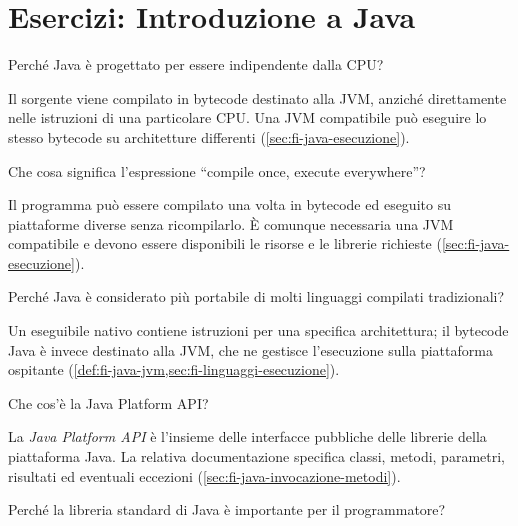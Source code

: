 \chapter{Esercizi: Introduzione a Java}
\label{chap:esercizi-introduzione-java}

\begin{exercise}
\label{ex:fi-esercizi-introduzione-java-portabilita-cpu}
Perché Java è progettato per essere indipendente dalla CPU?
\end{exercise}

Il sorgente viene compilato in bytecode destinato alla JVM, anziché direttamente
nelle istruzioni di una particolare CPU. Una JVM compatibile può eseguire lo
stesso bytecode su architetture differenti (\cref{sec:fi-java-esecuzione}).

\begin{exercise}
\label{ex:fi-esercizi-introduzione-java-compile-once}
Che cosa significa l'espressione ``compile once, execute everywhere''?
\end{exercise}

Il programma può essere compilato una volta in bytecode ed eseguito su
piattaforme diverse senza ricompilarlo. È comunque necessaria una JVM compatibile
e devono essere disponibili le risorse e le librerie richieste
(\cref{sec:fi-java-esecuzione}).

\begin{exercise}
\label{ex:fi-esercizi-introduzione-java-portabilita-confronto}
Perché Java è considerato più portabile di molti linguaggi compilati tradizionali?
\end{exercise}

Un eseguibile nativo contiene istruzioni per una specifica architettura; il
bytecode Java è invece destinato alla JVM, che ne gestisce l'esecuzione sulla
piattaforma ospitante (\cref{def:fi-java-jvm,sec:fi-linguaggi-esecuzione}).

\begin{exercise}
\label{ex:fi-esercizi-introduzione-java-platform-api}
Che cos'è la Java Platform API?
\end{exercise}

La \emph{Java Platform API} è l'insieme delle interfacce pubbliche
delle librerie della piattaforma Java. La relativa documentazione
specifica classi, metodi, parametri, risultati ed eventuali eccezioni
(\cref{sec:fi-java-invocazione-metodi}).

\begin{exercise}
\label{ex:fi-esercizi-introduzione-java-libreria-standard}
Perché la libreria standard di Java è importante per il programmatore?
\end{exercise}

